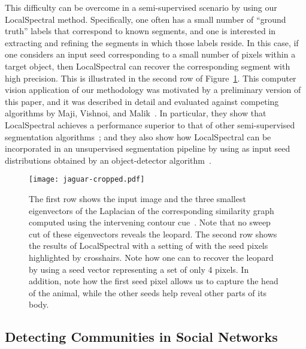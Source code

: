 \documentclass[11pt]{article}
\begin{document}
This difficulty can be overcome in a semi-supervised scenario by using 
our \textsf{LocalSpectral} method. 
Specifically, one often has a small number of ``ground truth'' labels that 
correspond to known segments, and one is interested in extracting and 
refining the segments in which those labels reside.
In this case, if one considers an input seed corresponding to a small number 
of pixels within a target object, then \textsf{LocalSpectral} can recover 
the corresponding segment with high precision.
This is illustrated in the second row of Figure~\ref{fig:imseg}. 
This computer vision application of our methodology was motivated by a 
preliminary version of this paper, and it was described in detail and evaluated against competing 
algorithms by Maji, Vishnoi, and Malik~\cite{MVM11}. 
In particular, they show that \textsf{LocalSpectral} achieves a performance superior to 
that of other semi-supervised segmentation algorithms~\cite{YS01,EOK07}; and 
they also show how \textsf{LocalSpectral} can be incorporated in an 
unsupervised segmentation pipeline by using as input seed distributions 
obtained by an object-detector algorithm~\cite{bmbm10}.

\begin{figure}[h]
\begin{center}
\texttt{[image: jaguar-cropped.pdf]}
   \end{center}
\caption{The first row shows the input image and the three smallest eigenvectors of the Laplacian of the corresponding similarity graph computed using the intervening contour cue~\cite{MAFM08}.  Note that no sweep cut of these eigenvectors reveals the leopard.  The second row shows the results of \textsf{LocalSpectral} with a setting of  with the seed pixels highlighted by crosshairs.  Note how one can to recover the leopard by using a seed vector representing a set of only 4 pixels.  In addition, note how the first seed pixel allows us to capture the head of the animal, while the other seeds help reveal other parts of its body. }
\label{fig:imseg}	
\end{figure}


\subsection{Detecting Communities in Social Networks}
\end{document}
